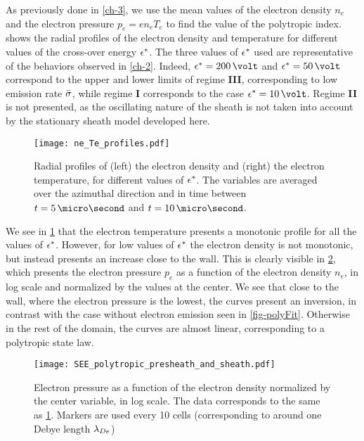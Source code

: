 As previously done in \cref{ch-3}, we use the mean values of the electron density $n_e$ and the electron pressure $ p_e = e n_e T_e$ to find the value of the polytropic index.
 shows the radial profiles of the electron density and temperature for different values of the cross-over energy $\epsilon^{*}$.
The three values of $\epsilon^{*}$ used are representative of the behaviors observed in \cref{ch-2}.
Indeed, $\crover=200\,\volt$ and $\crover=50\,\volt$ correspond to the upper and lower limits of regime {\bf III}, corresponding to low emission rate $ \bar{\sigma }$, while regime {\bf I} corresponds to the case $\crover=10\,\volt$.
Regime {\bf II} is not presented, as the oscillating nature of the sheath is not taken into account by the stationary sheath model developed here. 


\begin{figure}[!htb]
  \centering
  \texttt{[image: ne\_Te\_profiles.pdf]}
  \caption{Radial profiles of (left) the electron density and (right) the electron temperature, for different values of $\epsilon^{*}$. The variables are averaged over the azimuthal direction and in time between $t=5\,\micro\second$ and $t=10\,\micro\second$.  }
  \label{fig-radial_profiles_see}
\end{figure}

We see in \cref{fig-radial_profiles_see} that the electron temperature presents a monotonic profile for all the values of $\epsilon^{*}$.
However, for low values of $\epsilon^{*}$ the electron density is not monotonic, but instead presents an increase close to the wall.
This is clearly visible in \cref{fig-log_pe-ne}, which presents the electron pressure $p_e$ as a function of the electron density $n_e$, in log scale and normalized by the values at the center.
We see that close to the wall, where the electron pressure is the lowest, the curves present an inversion, in contrast with the case without electron emission seen in \cref{fig-polyFit}.
Otherwise in the rest of the domain, the curves are almost linear, corresponding to a polytropic state law.

\begin{figure}[!htb]
  \centering
  \texttt{[image: SEE\_polytropic\_presheath\_and\_sheath.pdf]}
  \caption{Electron pressure as a function of the electron density normalized by the center variable, in log scale. The data corresponds to the same as \cref{fig-radial_profiles_see}. Markers are used every 10 cells (corresponding to around one Debye length $\lambda_{De}$)}
  \label{fig-log_pe-ne}
\end{figure}


